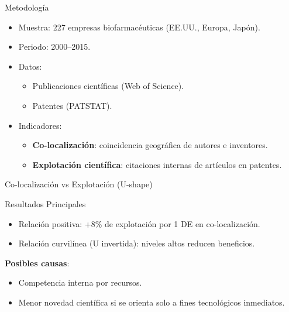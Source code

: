 \documentclass{beamer}
\begin{document}
	\begin{frame}{Metodología}
		\begin{itemize}
			\item Muestra: 227 empresas biofarmacéuticas (EE.UU., Europa, Japón).
			\item Periodo: 2000–2015.
			\item Datos:
			\begin{itemize}
				\item Publicaciones científicas (Web of Science).
				\item Patentes (PATSTAT).
			\end{itemize}
			\item Indicadores:
			\begin{itemize}
				\item \textbf{Co-localización}: coincidencia geográfica de autores e inventores.
				\item \textbf{Explotación científica}: citaciones internas de artículos en patentes.
			\end{itemize}
		\end{itemize}
	\end{frame}
	
	\begin{frame}{Co-localización vs Explotación (U-shape)}
		\centering
	\end{frame}
	\begin{frame}{Resultados Principales}
		\begin{itemize}
			\item Relación positiva: +8\% de explotación por 1 DE en co-localización.
			\item Relación curvilínea (U invertida): niveles altos reducen beneficios.
		\end{itemize}
		
		\textbf{Posibles causas}:
		\begin{itemize}
			\item Competencia interna por recursos.
			\item Menor novedad científica si se orienta solo a fines tecnológicos inmediatos.
		\end{itemize}
	\end{frame}
	
\end{document}
